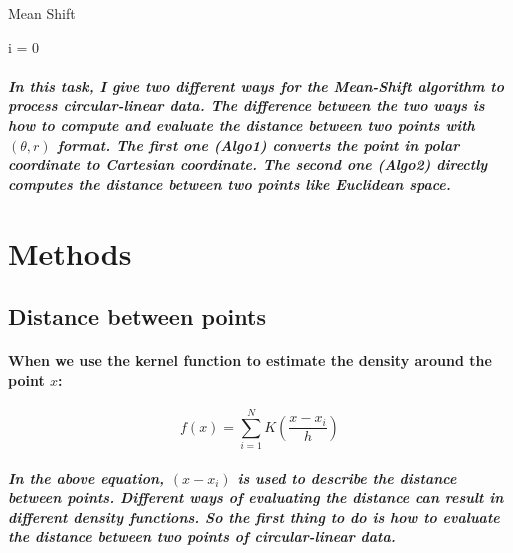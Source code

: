 \documentclass{article}
\begin{document}
\begin{algorithm}[hb]
    \caption{Mean Shift}
    i = 0\\
\end{algorithm}

\subparagraph{
In this task, I give two different ways for the Mean-Shift algorithm to process circular-linear data. The difference between the two ways is how to compute and evaluate the distance between two points with $(\theta, r)$ format. The first one (Algo1) converts the point in polar coordinate to Cartesian coordinate. The second one (Algo2) directly computes the distance between two points like Euclidean space.
}

\section{Methods}

\subsection{Distance between points}
\paragraph{
When we use the kernel function to estimate the density around the point $x$:
}
\begin{equation}
f(x) = \sum_{i=1}^{N}K(\frac{x-x_i}{h})
\end{equation}
\subparagraph{
In the above equation, $(x-x_i)$ is used to describe the \textit{distance} between points. Different ways of evaluating the distance can result in different density functions. So the first thing to do is how to evaluate the distance between two points of circular-linear data.
}
\end{document}
